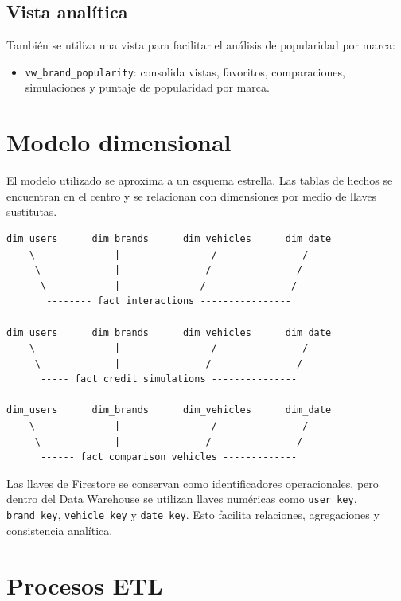 \documentclass[12pt,letterpaper]{article}
\begin{document}
\subsection{Vista analítica}

También se utiliza una vista para facilitar el análisis de popularidad por marca:

\begin{itemize}
    \item \texttt{vw\_brand\_popularity}: consolida vistas, favoritos, comparaciones, simulaciones y puntaje de popularidad por marca.
\end{itemize}

\section{Modelo dimensional}

El modelo utilizado se aproxima a un esquema estrella. Las tablas de hechos se encuentran en el centro y se relacionan con dimensiones por medio de llaves sustitutas.

\begin{lstlisting}[style=textstyle,caption={Relación conceptual del modelo dimensional}]
dim_users      dim_brands      dim_vehicles      dim_date
    \              |                /               /
     \             |               /               /
      \            |              /               /
       -------- fact_interactions ----------------

dim_users      dim_brands      dim_vehicles      dim_date
    \              |                /               /
     \             |               /               /
      ----- fact_credit_simulations ---------------

dim_users      dim_brands      dim_vehicles      dim_date
    \              |                /               /
     \             |               /               /
      ------ fact_comparison_vehicles -------------
\end{lstlisting}

Las llaves de Firestore se conservan como identificadores operacionales, pero dentro del Data Warehouse se utilizan llaves numéricas como \texttt{user\_key}, \texttt{brand\_key}, \texttt{vehicle\_key} y \texttt{date\_key}. Esto facilita relaciones, agregaciones y consistencia analítica.

\section{Procesos ETL}
\end{document}

